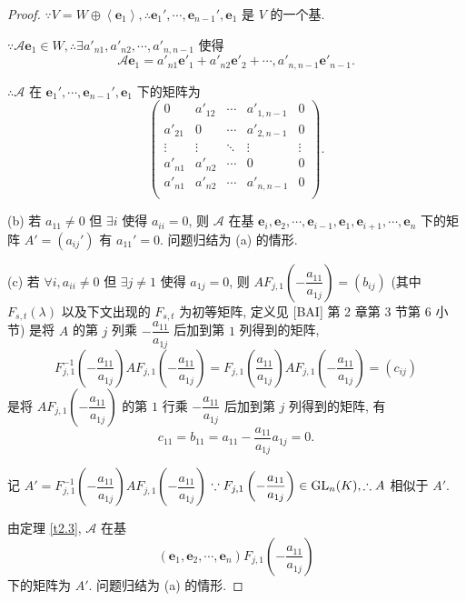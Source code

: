 \documentclass{ctexart}
\begin{document}
\begin{proof}
    $\because V=W\oplus\left<\boldsymbol{e}_1\right>,\therefore\boldsymbol{e}_1',\cdots,\boldsymbol{e}_{n-1}',\boldsymbol{e}_1$ 是 $V$ 的一个基.
    
    $\because\mathcal{A}\boldsymbol{e}_1\in W,\therefore\exists a'_{n1},a'_{n2},\cdots,a'_{n,n-1}$ 使得
    \[\mathcal{A}\boldsymbol{e}_1=a'_{n1}\boldsymbol{e}'_1+a'_{n2}\boldsymbol{e}'_2+\cdots,a'_{n,n-1}\boldsymbol{e}'_{n-1}.\]

    $\therefore\mathcal{A}$ 在 $\boldsymbol{e}_1',\cdots,\boldsymbol{e}_{n-1}',\boldsymbol{e}_1$ 下的矩阵为
    \[\begin{pmatrix}
        0 & a'_{12} & \cdots & a'_{1,n-1} & 0 \\
        a'_{21} & 0 & \cdots & a'_{2,n-1} & 0 \\
        \vdots & \vdots & \ddots & \vdots & \vdots \\
        a'_{n1} & a'_{n2} & \cdots & 0 & 0 \\
        a'_{n1} & a'_{n2} & \cdots & a'_{n,n-1} & 0 \\
    \end{pmatrix}.\]

    (b) 若 $a_{11}\neq0$ 但 $\exists i$ 使得 $a_{ii}=0$, 则 $\mathcal{A}$ 在基 $\boldsymbol{e}_i,\boldsymbol{e}_2,\cdots,\boldsymbol{e}_{i-1},\boldsymbol{e}_1,\boldsymbol{e}_{i+1},\cdots,\boldsymbol{e}_n$ 下的矩阵 $A'=(a_{ij}')$ 有 $a_{11}'=0$. 问题归结为 (a) 的情形.

    (c) 若 $\forall i,a_{ii}\neq0$ 但 $\exists j\neq 1$ 使得 $a_{1j}=0$, 则 $AF_{j,1}\left(-\dfrac{a_{11}}{a_{1j}}\right)=(b_{ij})$ (其中 $F_{s,t}(\lambda)$ 以及下文出现的 $F_{s,t}$ 为初等矩阵, 定义见 [BAI] 第 2 章第 3 节第 6 小节) 是将 $A$ 的第 $j$ 列乘 $-\dfrac{a_{11}}{a_{1j}}$ 后加到第 $1$ 列得到的矩阵,
    \[F^{-1}_{j,1}\left(-\dfrac{a_{11}}{a_{1j}}\right)AF_{j,1}\left(-\dfrac{a_{11}}{a_{1j}}\right)=F_{j,1}\left(\dfrac{a_{11}}{a_{1j}}\right)AF_{j,1}\left(-\dfrac{a_{11}}{a_{1j}}\right)=(c_{ij})\]
    是将 $AF_{j,1}\left(-\dfrac{a_{11}}{a_{1j}}\right)$ 的第 $1$ 行乘 $-\dfrac{a_{11}}{a_{1j}}$ 后加到第 $j$ 列得到的矩阵, 有
    \[c_{11}=b_{11}=a_{11}-\dfrac{a_{11}}{a_{1j}}a_{1j}=0.\]

    记 $A'=F^{-1}_{j,1}\left(-\dfrac{a_{11}}{a_{1j}}\right)AF_{j,1}\left(-\dfrac{a_{11}}{a_{1j}}\right)$ $\because F_{j,1}\left(-\dfrac{a_{11}}{a_{1j}}\right)\in\operatorname{GL} _n(K),\therefore A$ 相似于 $A'$.

    由定理 \ref{t2.3}, $\mathcal{A}$ 在基
    \[(\boldsymbol{e}_1,\boldsymbol{e}_2,\cdots,\boldsymbol{e}_n)F_{j,1}\left(-\dfrac{a_{11}}{a_{1j}}\right)\]
    下的矩阵为 $A'$. 问题归结为 (a) 的情形.


\end{proof}
\end{document}
